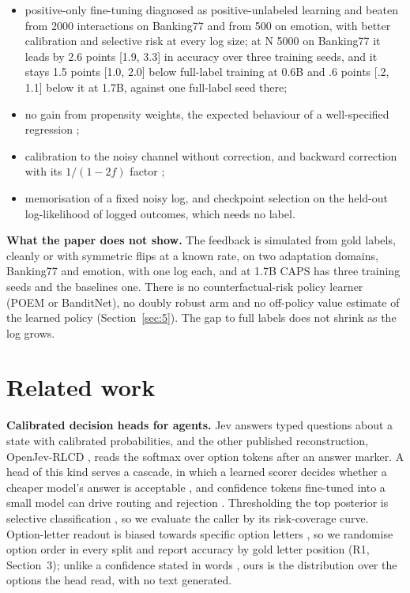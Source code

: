 \documentclass[10pt,letterpaper]{article}
\theoremstyle{plain}
\begin{document}
\begin{enumerate}
  \begin{itemize}
    \item positive-only fine-tuning diagnosed as positive-unlabeled learning \citep{elkan2008pu} and beaten from 2000 interactions on Banking77 and from 500 on emotion, with better calibration and selective risk at every log size; at N 5000 on Banking77 it leads by 2.6 points [1.9, 3.3] in accuracy over three training seeds, and it stays 1.5 points [1.0, 2.0] below full-label training at 0.6B and .6 points [.2, 1.1] below it at 1.7B, against one full-label seed there;
    \item no gain from propensity weights, the expected behaviour of a well-specified regression \citep{shimodaira2000covariate,byrd2019importance};
    \item calibration to the noisy channel without correction, and backward correction \citep{natarajan2013noisy,patrini2017losscorrection} with its $1/(1-2f)$ factor \citep{angluin1988noisy};
    \item memorisation of a fixed noisy log, and checkpoint selection on the held-out log-likelihood of logged outcomes, which needs no label.
  \end{itemize}
\end{enumerate}

\textbf{What the paper does not show.} The feedback is simulated from gold labels, cleanly or with symmetric flips at a known rate, on two adaptation domains, Banking77 and emotion, with one log each, and at 1.7B CAPS has three training seeds and the baselines one. There is no counterfactual-risk policy learner (POEM or BanditNet), no doubly robust arm and no off-policy value estimate of the learned policy (Section~\ref{sec:5}). The gap to full labels does not shrink as the log grows.

\section{Related work}\label{sec:2}

\textbf{Calibrated decision heads for agents.} Jev \citep{typesafe2026jev} answers typed questions about a state with calibrated probabilities, and the other published reconstruction, OpenJev-RLCD \citep{gao2026openjev}, reads the softmax over option tokens after an answer marker. A head of this kind serves a cascade, in which a learned scorer decides whether a cheaper model's answer is acceptable \citep{chen2023frugalgpt}, and confidence tokens fine-tuned into a small model can drive routing and rejection \citep{chuang2025selfref}. Thresholding the top posterior is selective classification \citep{geifman2017selective}, so we evaluate the caller by its risk-coverage curve. Option-letter readout is biased towards specific option letters \citep{zheng2024selectors}, so we randomise option order in every split and report accuracy by gold letter position (R1, Section~3); unlike a confidence stated in words \citep{xiong2024uncertainty}, ours is the distribution over the options the head read, with no text generated.
\end{document}
